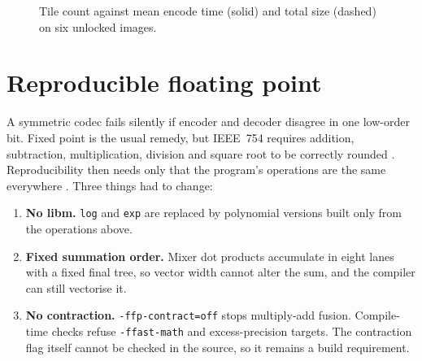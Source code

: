 \documentclass[10pt,twocolumn]{article}
\begin{document}
\begin{figure}[t]
\centering
{}
\caption{Tile count against mean encode time (solid) and total size (dashed) on six unlocked images.}
\label{fig:tiles}
\end{figure}

\section{Reproducible floating point}
\label{sec:portable}

A symmetric codec fails silently if encoder and decoder disagree in one low-order bit. Fixed point is the usual remedy, but IEEE~754 requires addition, subtraction, multiplication, division and square root to be correctly rounded \cite{ieee}. Reproducibility then needs only that the program's operations are the same everywhere \cite{monniaux}. Three things had to change:

\begin{enumerate}\setlength\itemsep{1pt}\setlength\parskip{0pt}
\item \textbf{No libm.} \texttt{log} and \texttt{exp} are replaced by polynomial versions built only from the operations above.
\item \textbf{Fixed summation order.} Mixer dot products accumulate in eight lanes with a fixed final tree, so vector width cannot alter the sum, and the compiler can still vectorise it.
\item \textbf{No contraction.} \texttt{-ffp-contract=off} stops multiply-add fusion. Compile-time checks refuse \texttt{-ffast-math} and excess-precision targets. The contraction flag itself cannot be checked in the source, so it remains a build requirement.
\end{enumerate}
\end{document}

